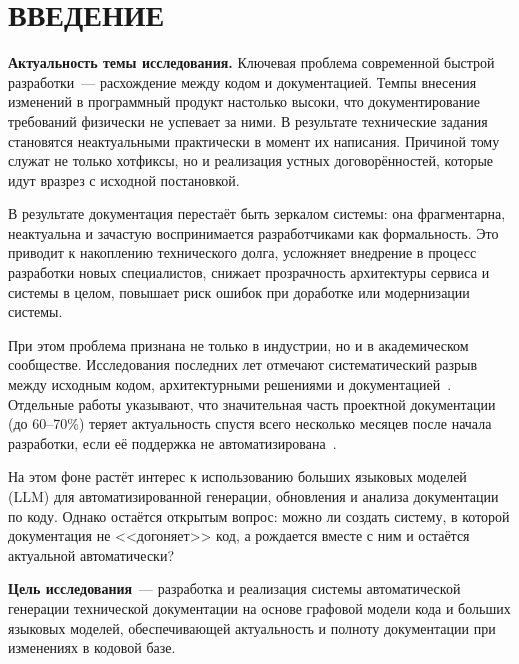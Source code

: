 
\section*{ВВЕДЕНИЕ}

\textbf{Актуальность темы исследования.}
Ключевая проблема современной быстрой разработки~--- расхождение между кодом и документацией. Темпы внесения изменений в программный продукт настолько высоки, что документирование требований физически не успевает за ними. В результате технические задания становятся неактуальными практически в момент их написания. Причиной тому служат не только хотфиксы, но и реализация устных договорённостей, которые идут вразрез с исходной постановкой.

В результате документация перестаёт быть зеркалом системы: она фрагментарна, неактуальна и зачастую воспринимается разработчиками как формальность. Это приводит к накоплению технического долга, усложняет внедрение в процесс разработки новых специалистов, снижает прозрачность архитектуры сервиса и системы в целом, повышает риск ошибок при доработке или модернизации системы.

При этом проблема признана не только в индустрии, но и в академическом сообществе. Исследования последних лет отмечают систематический разрыв между исходным кодом, архитектурными решениями и документацией~\cite{zhang2022comments,li2023coevolution}. Отдельные работы указывают, что значительная часть проектной документации (до 60--70\%) теряет актуальность спустя всего несколько месяцев после начала разработки, если её поддержка не автоматизирована~\cite{forward2002relevance,storey2021future}.

На этом фоне растёт интерес к использованию больших языковых моделей (LLM) для автоматизированной генерации, обновления и анализа документации по коду. Однако остаётся открытым вопрос: можно ли создать систему, в которой документация не <<догоняет>> код, а рождается вместе с ним и остаётся актуальной автоматически?

\textbf{Цель исследования}~--- разработка и реализация системы автоматической генерации технической документации на основе графовой модели кода и больших языковых моделей, обеспечивающей актуальность и полноту документации при изменениях в кодовой базе.


